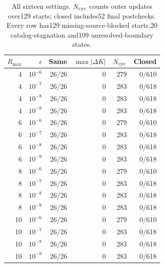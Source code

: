 \begin{table}[htbp]
\centering\small
\caption{All sixteen settings. $N_{\rm cyc}$ counts outer updates over129 starts; closed includes52 final postchecks. Every row has129 missing-source-blocked starts,20 catalog-stagnation and109 unresolved-boundary states.}
\label{tab:ao-stopping-detail}
\begin{tabular}{rrrrrr}
\hline
$R_{\max}$ & $\epsilon$ & Same & $\max|\Delta K|$ & $N_{\rm cyc}$ & Closed \\
\hline
4 & $10^{-6}$ &26/26 &0 &279 &0/610 \\
4 & $10^{-7}$ &26/26 &0 &283 &0/618 \\
4 & $10^{-8}$ &26/26 &0 &283 &0/618 \\
4 & $10^{-9}$ &26/26 &0 &283 &0/618 \\
6 & $10^{-6}$ &26/26 &0 &279 &0/610 \\
6 & $10^{-7}$ &26/26 &0 &283 &0/618 \\
6 & $10^{-8}$ &26/26 &0 &283 &0/618 \\
6 & $10^{-9}$ &26/26 &0 &283 &0/618 \\
8 & $10^{-6}$ &26/26 &0 &279 &0/610 \\
8 & $10^{-7}$ &26/26 &0 &283 &0/618 \\
8 & $10^{-8}$ &26/26 &0 &283 &0/618 \\
8 & $10^{-9}$ &26/26 &0 &283 &0/618 \\
10 & $10^{-6}$ &26/26 &0 &279 &0/610 \\
10 & $10^{-7}$ &26/26 &0 &283 &0/618 \\
10 & $10^{-8}$ &26/26 &0 &283 &0/618 \\
10 & $10^{-9}$ &26/26 &0 &283 &0/618 \\
\hline
\end{tabular}
\end{table}
